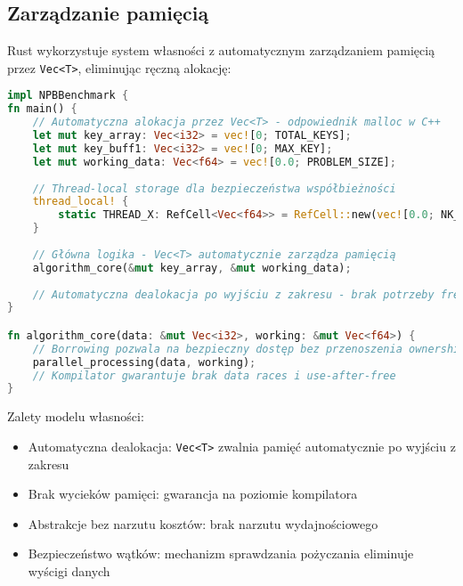 \subsection{Zarządzanie pamięcią}
Rust wykorzystuje system własności z automatycznym zarządzaniem pamięcią przez \texttt{Vec<T>}, eliminując ręczną alokację:
\begin{lstlisting}[language=Rust, caption={Zarządzanie pamięcią w benchmarkach NPB w języku Rust}, label={lst:rust_memory_management}]
impl NPBBenchmark {
fn main() {
    // Automatyczna alokacja przez Vec<T> - odpowiednik malloc w C++
    let mut key_array: Vec<i32> = vec![0; TOTAL_KEYS];
    let mut key_buff1: Vec<i32> = vec![0; MAX_KEY];
    let mut working_data: Vec<f64> = vec![0.0; PROBLEM_SIZE];
    
    // Thread-local storage dla bezpieczeństwa współbieżności
    thread_local! {
        static THREAD_X: RefCell<Vec<f64>> = RefCell::new(vec![0.0; NK_PLUS]);
    }
    
    // Główna logika - Vec<T> automatycznie zarządza pamięcią
    algorithm_core(&mut key_array, &mut working_data);
    
    // Automatyczna dealokacja po wyjściu z zakresu - brak potrzeby free()
}

fn algorithm_core(data: &mut Vec<i32>, working: &mut Vec<f64>) {
    // Borrowing pozwala na bezpieczny dostęp bez przenoszenia ownership
    parallel_processing(data, working);
    // Kompilator gwarantuje brak data races i use-after-free
}
\end{lstlisting}
Zalety modelu własności:
\begin{itemize}
    \item Automatyczna dealokacja: \texttt{Vec<T>} zwalnia pamięć automatycznie po wyjściu z zakresu
    \item Brak wycieków pamięci: gwarancja na poziomie kompilatora
    \item Abstrakcje bez narzutu kosztów: brak narzutu wydajnościowego
    \item Bezpieczeństwo wątków: mechanizm sprawdzania pożyczania eliminuje wyścigi danych
\end{itemize}

